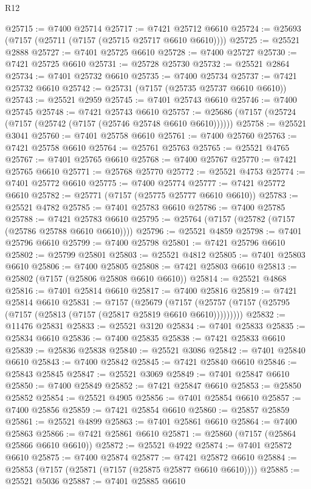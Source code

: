 \begin{lexlean}{R12}
\begin{coremodule}
@25715 := @7400 @25714
@25717 := @7421 @25712 @6610
@25724 := @25693 (@7157 (@25711 (@7157 (@25715 @25717 @6610 @6610))))
@25725 := @25521 @2888
@25727 := @7401 @25725 @6610
@25728 := @7400 @25727
@25730 := @7421 @25725 @6610
@25731 := @25728 @25730
@25732 := @25521 @2864
@25734 := @7401 @25732 @6610
@25735 := @7400 @25734
@25737 := @7421 @25732 @6610
@25742 := @25731 (@7157 (@25735 @25737 @6610 @6610))
@25743 := @25521 @2959
@25745 := @7401 @25743 @6610
@25746 := @7400 @25745
@25748 := @7421 @25743 @6610
@25757 := @25686 (@7157 (@25724 (@7157 (@25742 (@7157 (@25746 @25748 @6610 @6610))))))
@25758 := @25521 @3041
@25760 := @7401 @25758 @6610
@25761 := @7400 @25760
@25763 := @7421 @25758 @6610
@25764 := @25761 @25763
@25765 := @25521 @4765
@25767 := @7401 @25765 @6610
@25768 := @7400 @25767
@25770 := @7421 @25765 @6610
@25771 := @25768 @25770
@25772 := @25521 @4753
@25774 := @7401 @25772 @6610
@25775 := @7400 @25774
@25777 := @7421 @25772 @6610
@25782 := @25771 (@7157 (@25775 @25777 @6610 @6610))
@25783 := @25521 @4782
@25785 := @7401 @25783 @6610
@25786 := @7400 @25785
@25788 := @7421 @25783 @6610
@25795 := @25764 (@7157 (@25782 (@7157 (@25786 @25788 @6610 @6610))))
@25796 := @25521 @4859
@25798 := @7401 @25796 @6610
@25799 := @7400 @25798
@25801 := @7421 @25796 @6610
@25802 := @25799 @25801
@25803 := @25521 @4812
@25805 := @7401 @25803 @6610
@25806 := @7400 @25805
@25808 := @7421 @25803 @6610
@25813 := @25802 (@7157 (@25806 @25808 @6610 @6610))
@25814 := @25521 @4868
@25816 := @7401 @25814 @6610
@25817 := @7400 @25816
@25819 := @7421 @25814 @6610
@25831 := @7157
    (@25679 (@7157 (@25757 (@7157 (@25795 (@7157 (@25813 (@7157 (@25817 @25819 @6610 @6610)))))))))
@25832 := @11476 @25831
@25833 := @25521 @3120
@25834 := @7401 @25833
@25835 := @25834 @6610
@25836 := @7400 @25835
@25838 := @7421 @25833 @6610
@25839 := @25836 @25838
@25840 := @25521 @3086
@25842 := @7401 @25840 @6610
@25843 := @7400 @25842
@25845 := @7421 @25840 @6610
@25846 := @25843 @25845
@25847 := @25521 @3069
@25849 := @7401 @25847 @6610
@25850 := @7400 @25849
@25852 := @7421 @25847 @6610
@25853 := @25850 @25852
@25854 := @25521 @4905
@25856 := @7401 @25854 @6610
@25857 := @7400 @25856
@25859 := @7421 @25854 @6610
@25860 := @25857 @25859
@25861 := @25521 @4899
@25863 := @7401 @25861 @6610
@25864 := @7400 @25863
@25866 := @7421 @25861 @6610
@25871 := @25860 (@7157 (@25864 @25866 @6610 @6610))
@25872 := @25521 @4922
@25874 := @7401 @25872 @6610
@25875 := @7400 @25874
@25877 := @7421 @25872 @6610
@25884 := @25853 (@7157 (@25871 (@7157 (@25875 @25877 @6610 @6610))))
@25885 := @25521 @5036
@25887 := @7401 @25885 @6610

\end{coremodule}
\end{lexlean}
